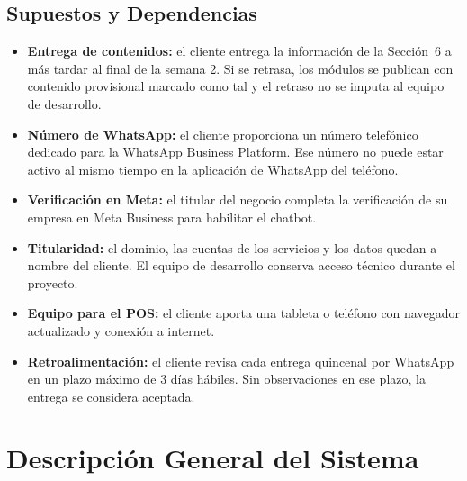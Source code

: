 \documentclass[11pt,letterpaper]{article}
\begin{document}
\subsection{Supuestos y Dependencias}
\begin{itemize}[leftmargin=1.5em]
    \item \textbf{Entrega de contenidos:} el cliente entrega la información de la Sección~6 a más tardar al final de la semana 2. Si se retrasa, los módulos se publican con contenido provisional marcado como tal y el retraso no se imputa al equipo de desarrollo.
    \item \textbf{Número de WhatsApp:} el cliente proporciona un número telefónico dedicado para la WhatsApp Business Platform. Ese número no puede estar activo al mismo tiempo en la aplicación de WhatsApp del teléfono.
    \item \textbf{Verificación en Meta:} el titular del negocio completa la verificación de su empresa en Meta Business para habilitar el chatbot.
    \item \textbf{Titularidad:} el dominio, las cuentas de los servicios y los datos quedan a nombre del cliente. El equipo de desarrollo conserva acceso técnico durante el proyecto.
    \item \textbf{Equipo para el POS:} el cliente aporta una tableta o teléfono con navegador actualizado y conexión a internet.
    \item \textbf{Retroalimentación:} el cliente revisa cada entrega quincenal por WhatsApp en un plazo máximo de 3 días hábiles. Sin observaciones en ese plazo, la entrega se considera aceptada.
\end{itemize}

\section{Descripción General del Sistema}
\end{document}

